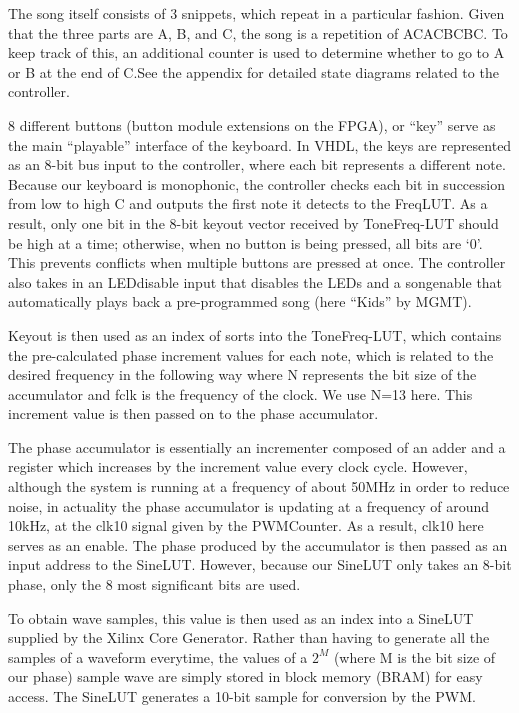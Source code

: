 \documentclass{article}
\begin{document}
    The song itself consists of 3 snippets, which repeat in a particular fashion. Given that the three parts are A, B, and C, the song is a repetition of ACACBCBC. To keep track of this, an additional counter is used to determine whether to go to A or B at the end of C.See the appendix for detailed state diagrams related to the controller.
    
    8 different buttons (button module extensions on the FPGA), or ``key'' serve as the main ``playable'' interface of the keyboard. In VHDL, the keys are represented as an 8-bit bus input to the controller, where each bit represents a different note. Because our keyboard is monophonic, the controller checks each bit in succession from low to high C and outputs the first note it detects to the FreqLUT. As a result, only one bit in the 8-bit key\textunderscore out vector received by ToneFreq-LUT should be high at a time; otherwise, when no button is being pressed, all bits are `0'. This prevents conflicts when multiple buttons are pressed at once. The controller also takes in an LED\textunderscore disable input that disables the LEDs and a song\textunderscore enable that automatically plays back a pre-programmed song (here ``Kids'' by MGMT).

    Key\textunderscore out is then used as an index of sorts into the ToneFreq-LUT, which contains the pre-calculated phase increment values for each note, which is related to the desired frequency in the following way
    where N represents the bit size of the accumulator and fclk is the frequency of the clock. We use N=13 here. This increment value is then passed on to the phase accumulator.

    The phase accumulator is essentially an incrementer composed of an adder and a register which increases by the increment value every clock cycle. However, although the system is running at a frequency of about 50MHz in order to reduce noise, in actuality the phase accumulator is updating at a frequency of around 10kHz, at the clk10 signal given by the PWMCounter. As a result, clk10 here serves as an enable. The phase produced by the accumulator is then passed as an input address to the SineLUT. However, because our SineLUT only takes an 8-bit phase, only the 8 most significant bits are used.

    To obtain wave samples, this value is then used as an index into a SineLUT supplied by the Xilinx Core Generator. Rather than having to generate all the samples of a waveform everytime, the values of a $2^M$ (where M is the bit size of our phase) sample wave are simply stored in block memory (BRAM) for easy access. The SineLUT generates a 10-bit sample for conversion by the PWM.
\end{document}
